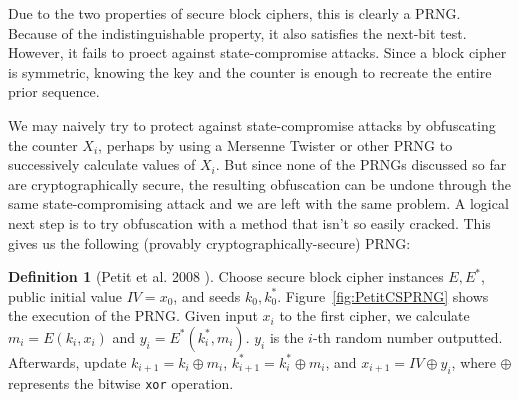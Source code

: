 \documentclass[titlepage]{article}
\theoremstyle{definition}
\newtheorem{definition}{Definition}[section]
\begin{document}
Due to the two properties of secure block ciphers, this is clearly a PRNG. Because of the indistinguishable property, it also satisfies the next-bit test. However, it fails to proect against state-compromise attacks. Since a block cipher is symmetric, knowing the key and the counter is enough to recreate the entire prior sequence.

We may naively try to protect against state-compromise attacks by obfuscating the counter $X_{i}$, perhaps by using a Mersenne Twister or other PRNG to successively calculate values of $X_i$. But since none of the PRNGs discussed so far are cryptographically secure, the resulting obfuscation can be undone through the same state-compromising attack and we are left with the same problem. A logical next step is to try obfuscation with a method that isn't so easily cracked. This gives us the following (provably cryptographically-secure) PRNG:

\begin{definition}[Petit et al. 2008 \cite{Petit}]
Choose secure block cipher instances $E, E^*$, public initial value $IV = x_0$, and seeds $k_0, k_0^*$. Figure~\ref{fig:PetitCSPRNG} shows the execution of the PRNG.
Given input $x_i$ to the first cipher, we calculate $m_i = E(k_i, x_i)$ and $y_i = E^*(k_i^*, m_i)$. $y_i$ is the $i$-th random number outputted. Afterwards, update $k_{i+1} = k_i \oplus m_i$, $k_{i+1}^* = k_i^* \oplus m_i$, and $x_{i+1} = IV \oplus y_i$, where $\oplus$ represents the bitwise \verb|xor| operation.
\end{definition}
\end{document}
